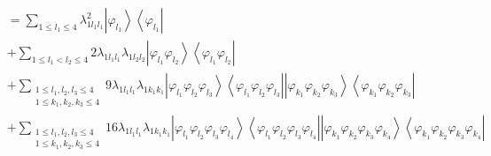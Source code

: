 \documentclass[aps,preprint]{revtex4}%
\begin{document}
\begin{align*}
&  =\sum_{1\leq l_{1}\leq4}\lambda_{1l_{1}l_{1}}^{2}\left\vert \varphi_{l_{1}%
}\right\rangle \left\langle \varphi_{l_{1}}\right\vert \\
&  +\sum_{1\leq l_{1}<l_{2}\leq4}2\lambda_{1l_{1}l_{1}}\lambda_{1l_{2}l_{2}%
}\left\vert \varphi_{l_{1}}\varphi_{l_{2}}\right\rangle \left\langle
\varphi_{l_{1}}\varphi_{l_{2}}\right\vert \\
&  +\sum_{\substack{1\leq l_{1},l_{2},l_{3}\leq4\\1\leq k_{1},k_{2},k_{3}%
\leq4}}9\lambda_{1l_{1}l_{1}}\lambda_{1k_{1}k_{1}}\left\vert \varphi_{l_{1}%
}\varphi_{l_{2}}\varphi_{l_{3}}\right\rangle \left\langle \varphi_{l_{1}%
}\varphi_{l_{2}}\varphi_{l_{3}}\right\vert \left\vert \varphi_{k_{1}}%
\varphi_{k_{2}}\varphi_{k_{3}}\right\rangle \left\langle \varphi_{k_{1}%
}\varphi_{k_{2}}\varphi_{k_{3}}\right\vert \\
&  +\sum_{\substack{1\leq l_{1},l_{2},l_{3}\leq4\\1\leq k_{1},k_{2},k_{3}%
\leq4}}16\lambda_{1l_{1}l_{1}}\lambda_{1k_{1}k_{1}}\left\vert \varphi_{l_{1}%
}\varphi_{l_{2}}\varphi_{l_{3}}\varphi_{l_{4}}\right\rangle \left\langle
\varphi_{l_{1}}\varphi_{l_{2}}\varphi_{l_{3}}\varphi_{l_{4}}\right\vert
\left\vert \varphi_{k_{1}}\varphi_{k_{2}}\varphi_{k_{3}}\varphi_{k_{4}%
}\right\rangle \left\langle \varphi_{k_{1}}\varphi_{k_{2}}\varphi_{k_{3}%
}\varphi_{k_{4}}\right\vert
\end{align*}
%
\end{document}
